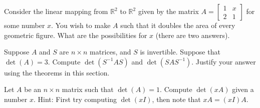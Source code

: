 \begin{exercise}
Consider the linear mapping from ${\mathbb R}^2$ to ${\mathbb R}^2$
given by the  matrix
$A = \begin{bmatrix}
1 & x \\
2 & 1
\end{bmatrix}$
for some number $x$.  You wish to make $A$ such that it doubles the area of
every geometric figure.  What are the possibilities for $x$ (there are two
answers).
\end{exercise}

\begin{exercise}
Suppose $A$ and $S$ are $n \times n$ matrices, and $S$ is invertible.
Suppose that $\det(A) = 3$.  Compute $\det(S^{-1}AS)$ and 
$\det(SAS^{-1})$.  Justify your answer using the theorems in this section.
\end{exercise}

\begin{exercise}
Let $A$ be an $n \times n$ matrix such that $\det(A)=1$.
Compute $\det(x A)$ given a number $x$.  Hint: First try computing
$\det(xI)$, then note that $xA = (xI)A$.
\end{exercise}

\setcounter{exercise}{100}

